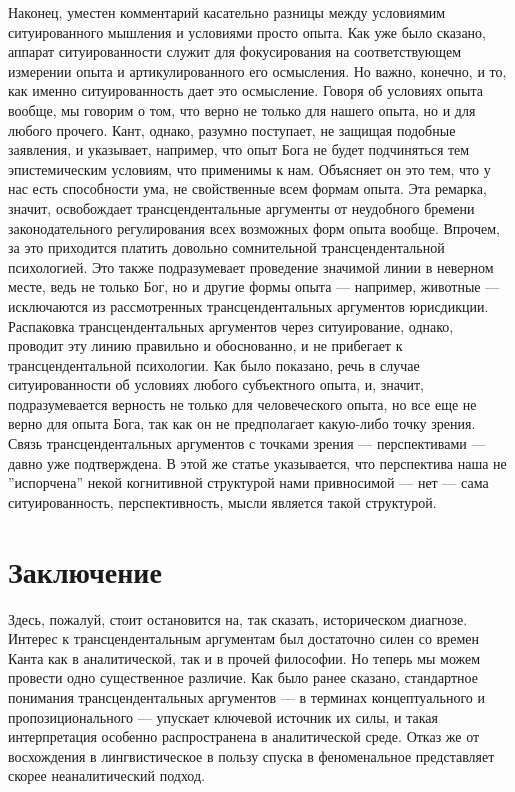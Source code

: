 \documentclass{article}
\begin{document}
Наконец, уместен комментарий касательно разницы между условиямим ситуированного мышления и условиями просто опыта. Как уже было сказано, аппарат ситуированности служит для фокусирования на соответствующем измерении опыта и артикулированного его осмысления. Но важно, конечно, и то, как именно ситуированность дает это осмысление. Говоря об условиях опыта вообще, мы говорим о том, что верно не только для нашего опыта, но и для любого прочего. Кант, однако, разумно поступает, не защищая подобные заявления, и указывает, например, что опыт Бога не будет подчиняться тем эпистемическим условиям, что применимы к нам. Объясняет он это тем, что у нас есть способности ума, не свойственные всем формам опыта. Эта ремарка, значит, освобождает трансцендентальные аргументы от неудобного бремени законодательного регулирования всех возможных форм опыта вообще. Впрочем, за это приходится платить довольно сомнительной трансцендентальной психологией. Это также подразумевает проведение значимой линии в неверном месте, ведь не только Бог, но и другие формы опыта — например, животные — исключаются из рассмотренных трансцендентальных аргументов юрисдикции. Распаковка трансцендентальных аргументов через ситуирование, однако, проводит эту линию правильно и обоснованно, и не прибегает к трансцендентальной психологии. Как было показано, речь в случае ситуированности об условиях любого субъектного опыта, и, значит, подразумевается верность не только для человеческого опыта, но все еще не верно для опыта Бога, так как он не предполагает какую-либо точку зрения. Связь трансцендентальных аргументов с точками зрения — перспективами — давно уже подтверждена. В этой же статье указывается, что перспектива наша не ''испорчена'' некой когнитивной структурой нами привносимой — нет — сама ситуированность, перспективность, мысли является такой структурой.

\section{Заключение}

Здесь, пожалуй, стоит остановится на, так сказать, историческом диагнозе. Интерес к трансцендентальным аргументам был достаточно силен со времен Канта как в аналитической, так и в прочей философии. Но теперь мы можем провести одно существенное различие. Как было ранее сказано, стандартное понимания трансцендентальных аргументов — в терминах концептуального и пропозиционального — упускает ключевой источник их силы, и такая интерпретация особенно распространена в аналитической среде. Отказ же от восхождения в лингвистическое в пользу спуска в феноменальное представляет скорее неаналитический подход.
\end{document}
